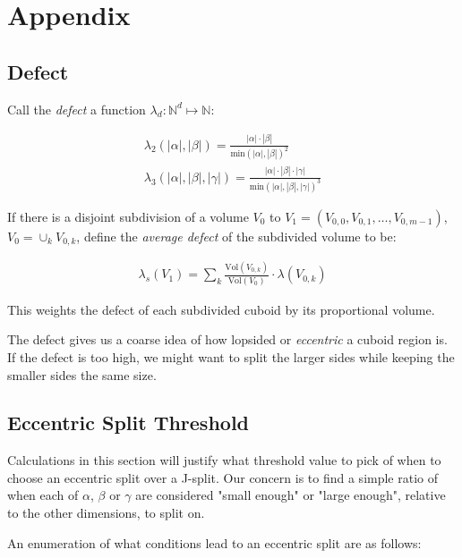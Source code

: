 

\section{Appendix}


\subsection{Defect} \label{appendix:defect}

Call the \textit{defect} a function $\lambda _ d : \mathbb{N}^d \mapsto \mathbb{N}$:

$$
\begin{array}{l}
\lambda _ 2 (|\alpha|,|\beta|) = \frac{ |\alpha| \cdot |\beta| }{ \text{min}(|\alpha|,|\beta|)^2 } \\
\lambda _ 3 (|\alpha|,|\beta|,|\gamma|) = \frac{ |\alpha| \cdot |\beta| \cdot |\gamma| }{ \text{min}(|\alpha|,|\beta|,|\gamma|)^3 }
\end{array}
$$

If there is a disjoint subdivision of a volume $V_0$ to $V_1  = ( V _ {0,0}, V _ {0,1}, \dots, V _ {0,m-1} )$,
$V _ 0  = \cup _ {k} V _ {0,k}$,
define the \textit{average defect} of the subdivided volume to be:

$$
\begin{array}{l}
  \lambda _ {s} ( V _ 1 ) = \sum _ {k} \frac{ \text{Vol}(V _ {0,k}) }{ \text{Vol}( V _ 0 ) } \cdot \lambda( V _ {0,k} )
\end{array}
$$

This weights the defect of each subdivided cuboid by its proportional volume.

The defect gives us a coarse idea of how lopsided or \textit{eccentric} a cuboid region is.
If the defect is too high, we might want to split the larger sides while keeping the smaller sides the same size.

\subsection{Eccentric Split Threshold}

Calculations in this section will justify what threshold value to pick of when to choose an
eccentric split over a J-split.
Our concern is to find a simple ratio of when each of $\alpha$, $\beta$ or $\gamma$ are considered
"small enough" or "large enough", relative to the other dimensions, to split on.

An enumeration of what conditions lead to an eccentric split are as follows:

